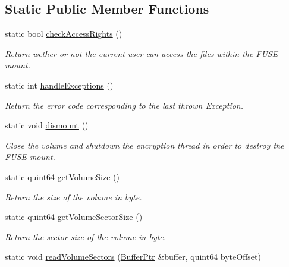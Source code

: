 \subsection*{Static Public Member Functions}
\begin{DoxyCompactItemize}
\item 
static bool \hyperlink{class_gost_crypt_1_1_fuse_driver_1_1_fuse_service_af6d74b87def44e650978fe446d4d1593}{check\+Access\+Rights} ()
\begin{DoxyCompactList}\small\item\em Return wether or not the current user can access the files within the F\+U\+SE mount. \end{DoxyCompactList}\item 
static int \hyperlink{class_gost_crypt_1_1_fuse_driver_1_1_fuse_service_a028d4692dbaad0660a017b95e95e286e}{handle\+Exceptions} ()
\begin{DoxyCompactList}\small\item\em Return the error code corresponding to the last thrown Exception. \end{DoxyCompactList}\item 
static void \hyperlink{class_gost_crypt_1_1_fuse_driver_1_1_fuse_service_ab5026717d04c3ecd8d0e32a8deb81589}{dismount} ()
\begin{DoxyCompactList}\small\item\em Close the volume and shutdown the encryption thread in order to destroy the F\+U\+SE mount. \end{DoxyCompactList}\item 
static quint64 \hyperlink{class_gost_crypt_1_1_fuse_driver_1_1_fuse_service_a7220db84a173f86716e34df4115b85c1}{get\+Volume\+Size} ()
\begin{DoxyCompactList}\small\item\em Return the size of the volume in byte. \end{DoxyCompactList}\item 
static quint64 \hyperlink{class_gost_crypt_1_1_fuse_driver_1_1_fuse_service_a71cd668462d167ba83f04f2218ba7292}{get\+Volume\+Sector\+Size} ()
\begin{DoxyCompactList}\small\item\em Return the sector size of the volume in byte. \end{DoxyCompactList}\item 
static void \hyperlink{class_gost_crypt_1_1_fuse_driver_1_1_fuse_service_a083ec1d770ff1f0f45e466e9e1e50dbf}{read\+Volume\+Sectors} (\hyperlink{class_gost_crypt_1_1_buffer_ptr}{Buffer\+Ptr} \&buffer, quint64 byte\+Offset)

\end{DoxyCompactItemize}
